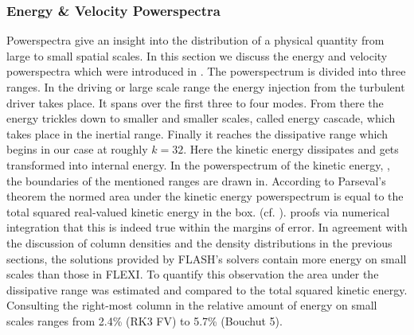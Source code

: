 


\subsubsection{Energy \& Velocity Powerspectra}
\label{sec:stirturb-pws}
Powerspectra give an insight into the distribution of a physical quantity from large to
small spatial scales. In this section we discuss the energy and velocity powerspectra
which were introduced in . The powerspectrum is
divided into three ranges. In the driving or large scale range the energy
injection from the turbulent driver takes place. It spans over the first three
to four modes.  From there the energy trickles down to smaller and smaller
scales, called energy cascade, which takes place in the inertial range. Finally
it reaches the dissipative range which begins in our case at roughly $k = 32$.
Here the kinetic energy dissipates and gets transformed into internal energy.
In the powerspectrum of the kinetic energy,
, the boundaries of the
mentioned ranges are drawn in. According to Parseval's theorem the normed area
under the kinetic energy powerspectrum is equal to the total squared real-valued
kinetic energy in the box. (cf. ).
 proofs via numerical integration
that this is indeed true within the margins of error.  In agreement with the
discussion of column densities and the density distributions in the previous
sections, the solutions provided by FLASH's solvers contain more energy on small
scales than those in FLEXI. To quantify this observation the area under the 
dissipative range was estimated and compared to the total squared kinetic energy.
Consulting the right-most column in  the relative amount of
energy on small scales ranges from 2.4\% (RK3 FV) to 5.7\% (Bouchut 5).

